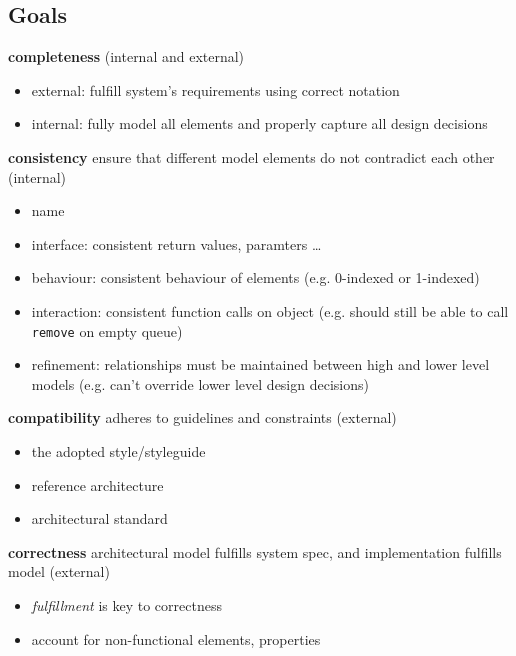 \documentclass[]{article}
\theoremstyle{definition}
\begin{document}
	\subsection{Goals}
	\textbf{completeness} (internal and external)
	\begin{itemize}
		\item external: fulfill system's requirements using correct notation
		\item internal: fully model all elements and properly capture all design decisions
	\end{itemize}
	\textbf{consistency} ensure that different model elements do not contradict each other (internal)
	\begin{itemize}
		\item name
		\item interface: consistent return values, paramters \dots
		\item behaviour: consistent behaviour of elements (e.g. 0-indexed or 1-indexed)
		\item interaction: consistent function calls on object (e.g. should still be able to call \texttt{remove} on empty queue)
		\item refinement: relationships must be maintained between high and lower level models (e.g. can't override lower level design decisions)
	\end{itemize}
	\textbf{compatibility} adheres to guidelines and constraints (external)
	\begin{itemize}
		\item the adopted style/styleguide
		\item reference architecture
		\item architectural standard
	\end{itemize}
	\textbf{correctness} architectural model fulfills system spec, and implementation fulfills model (external)
	\begin{itemize}
		\item \textit{fulfillment} is key to correctness
		\item account for non-functional elements, properties
	\end{itemize}
\end{document}
